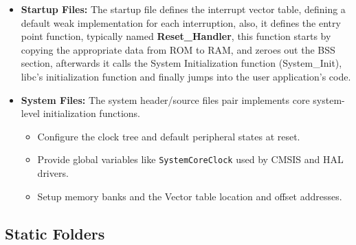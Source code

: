 \begin{itemize}
\begin{itemize}
\begin{itemize}
            \end{itemize}
        \end{itemize}
    \item \textbf{Startup Files:} The startup file defines the interrupt vector table, defining a default weak implementation for each interruption, also, it defines the entry point function, typically named \textbf{Reset\_Handler}, this function starts by copying the appropriate data from ROM to RAM, and zeroes out the BSS section, afterwards it calls the System Initialization function (System\_Init), libc's initialization function and finally jumps into the user application's code.
    \item \textbf{System Files:} The system header/source files pair implements core system-level initialization functions.
            \begin{itemize}
                \item Configure the clock tree and default peripheral states at reset.
                \item Provide global variables like \texttt{SystemCoreClock} used by CMSIS and HAL drivers.
                \item Setup memory banks and the Vector table location and offset addresses.
            \end{itemize}
\end{itemize}
\subsection{Static Folders}
